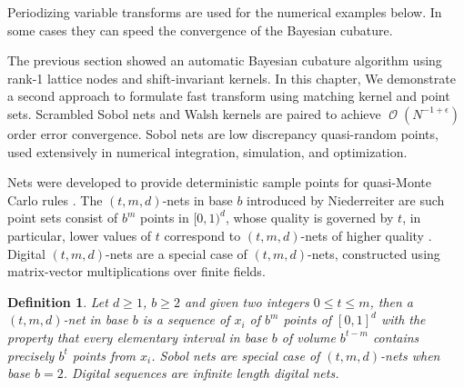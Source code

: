 \documentclass{iitthesis}          %
\DeclareMathOperator{\Order}{{\mathcal O}}
\newtheorem{defn}{Definition}
\begin{document}
Periodizing variable transforms are used for the numerical examples below.  In some cases they can speed the convergence of the Bayesian cubature. 

































\label{sec:sobol_walsh}


The previous section showed an automatic Bayesian cubature algorithm using rank-1 lattice nodes and shift-invariant kernels. 
In this chapter, We demonstrate a second approach to formulate fast transform using matching kernel and point sets. 
Scrambled Sobol nets and Walsh kernels are paired to achieve $\Order(N^{-1 + \epsilon})$  order error convergence. 
Sobol nets \cite{Sob67} are low discrepancy quasi-random points, used extensively in numerical integration, simulation, and optimization. 

Nets were developed to provide deterministic sample points for quasi-Monte Carlo rules \cite{Nie05a}.
The $(t,m, d)$-nets in base $b$ introduced by Niederreiter are such point sets consist of $b^m$ points in $[0, 1)^d$, whose quality is governed by $t$, in particular, lower values of $t$ correspond to $(t,m, d)$-nets of higher quality \cite{Bald10a}.
Digital $(t,m, d)$-nets are a special case of $(t,m, d)$-nets, constructed using matrix-vector multiplications over finite fields.

\begin{defn}
Let $d \ge 1$, $b\ge 2$ and given two integers $0 \le t \le m$, then a $(t,m,d)$-net in base $b$ is a sequence of $x_i$ of $b^m$ points of $[0,1]^d$  
with the property that every elementary interval in base $b$ of volume $b^{t-m}$ contains precisely $b^t$ points from $x_i$. Sobol nets are special case of $(t,m, d)$-nets when base $b=2$. Digital sequences are infinite length digital nets.
\end{defn}
\end{document}
